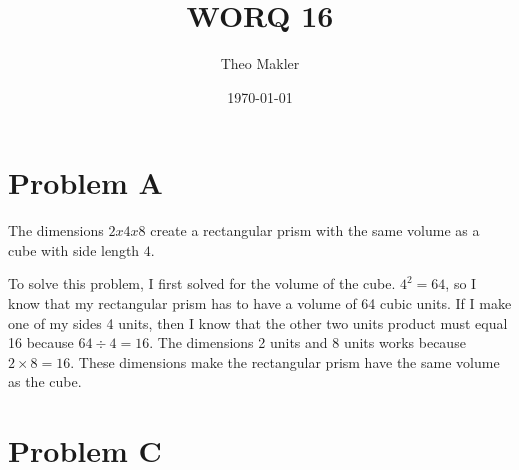 \documentclass[a4paper]{article}
\title{WORQ 16}
\author{Theo Makler}
\date{\today}
\begin{document}
\maketitle

\section{Problem A}

The dimensions $2 x 4 x 8$ create a rectangular prism with the same volume as a cube with side length $4$.

To solve this problem, I first solved for the volume of the cube. $4^2=64$, so I know that my rectangular prism has to have a volume of 64 cubic units. If I make one of my sides 4 units, then I know that the other two units product must equal 16 because $64 \div 4 = 16$. The dimensions 2 units and 8 units works because $2\times8=16$. These dimensions make the rectangular prism have the same volume as the cube.

\section{Problem C}
\end{document}
